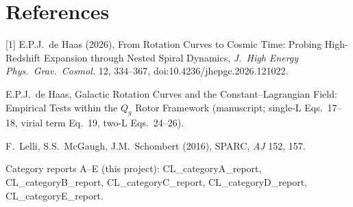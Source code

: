 \documentclass[10pt]{article}
\begin{document}
\section*{References}\small
[1] E.P.J.\ de Haas (2026), From Rotation Curves to Cosmic Time: Probing High-Redshift Expansion through Nested Spiral Dynamics, \emph{J.\ High Energy Phys.\ Grav.\ Cosmol.} 12, 334--367, doi:10.4236/jhepgc.2026.121022.\par
[2] E.P.J.\ de Haas, Galactic Rotation Curves and the Constant--Lagrangian Field: Empirical Tests within the $Q_g$ Rotor Framework (manuscript; single-L Eqs.~17--18, virial term Eq.~19, two-L Eqs.~24--26).\par
[3] F.\ Lelli, S.S.\ McGaugh, J.M.\ Schombert (2016), SPARC, \emph{AJ} 152, 157.\par
Category reports A--E (this project): CL\_categoryA\_report, CL\_categoryB\_report, CL\_categoryC\_report, CL\_categoryD\_report, CL\_categoryE\_report.
\end{document}
